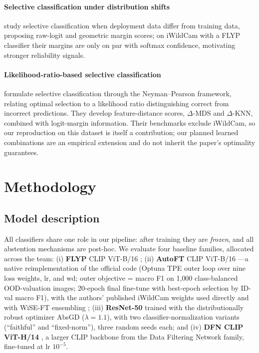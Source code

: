 \documentclass{article}
\begin{document}
\paragraph{Selective classification under distribution shifts}
\citet{liang2024selectiveclassificationdistributionshifts} study selective classification
when deployment data differ from training data, proposing raw-logit and geometric margin
scores; on iWildCam with a FLYP classifier their margins are only on par with softmax
confidence, motivating stronger reliability signals.

\paragraph{Likelihood-ratio-based selective classification}
\citet{heng2026know} formulate selective classification through the Neyman--Pearson
framework, relating optimal selection to a likelihood ratio distinguishing correct from
incorrect predictions. They develop feature-distance scores, $\Delta$-MDS and $\Delta$-KNN,
combined with logit-margin information. Their benchmarks exclude iWildCam, so our
reproduction on this dataset is itself a contribution; our planned learned combinations
are an empirical extension and do not inherit the paper's optimality guarantees.

\section{Methodology}

\subsection{Model description}
All classifiers share one role in our pipeline: after training they are \emph{frozen},
and all abstention mechanisms are post-hoc. We evaluate four baseline families, allocated
across the team: (i) \textbf{FLYP} CLIP ViT-B/16 \citep{goyal2023flyp}; (ii) \textbf{AutoFT}
CLIP ViT-B/16 \citep{choi2024autoft}---a native reimplementation of the official code
(Optuna TPE outer loop over nine loss weights, lr, and wd; outer objective = macro F1 on
1{,}000 class-balanced OOD-valuation images; 20-epoch final fine-tune with best-epoch
selection by ID-val macro F1), with the authors' published iWildCam weights used directly
and with WiSE-FT ensembling \citep{wortsman2022wiseft}; (iii) \textbf{ResNet-50} trained
with the distributionally robust optimizer AbsGD \citep{absgd202X} ($\lambda{=}1.1$), with
two classifier-normalization variants (``faithful'' and ``fixed-norm''), three random
seeds each; and (iv) \textbf{DFN CLIP ViT-H/14} \citep{fang2023dfn}, a larger CLIP
backbone from the Data Filtering Network family, fine-tuned at lr $10^{-5}$.
\end{document}
